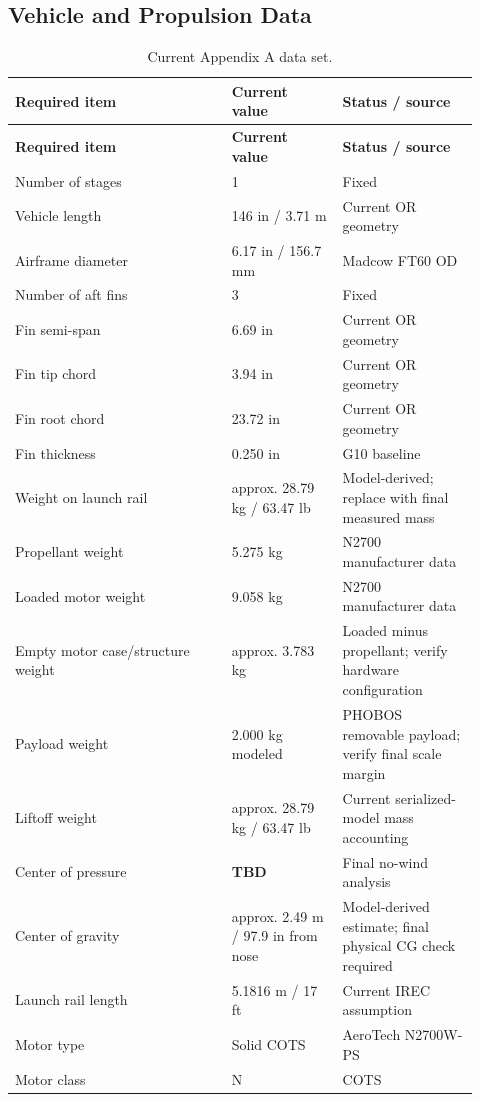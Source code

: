 \documentclass[10pt]{article}
\newcommand{\TBD}{\textbf{TBD}}
\begin{document}
\subsection{Vehicle and Propulsion Data}
\begin{longtable}{@{}p{0.43\linewidth}p{0.22\linewidth}p{0.27\linewidth}@{}}
\caption{Current Appendix A data set.}\\
\toprule
\textbf{Required item} & \textbf{Current value} & \textbf{Status / source} \\
\midrule
\endfirsthead
\toprule
\textbf{Required item} & \textbf{Current value} & \textbf{Status / source} \\
\midrule
\endhead
Number of stages & 1 & Fixed \\
Vehicle length & 146 in / 3.71 m & Current OR geometry \\
Airframe diameter & 6.17 in / 156.7 mm & Madcow FT60 OD \\
Number of aft fins & 3 & Fixed \\
Fin semi-span & 6.69 in & Current OR geometry \\
Fin tip chord & 3.94 in & Current OR geometry \\
Fin root chord & 23.72 in & Current OR geometry \\
Fin thickness & 0.250 in & G10 baseline \\
Weight on launch rail & approx. 28.79 kg / 63.47 lb & Model-derived; replace with final measured mass \\
Propellant weight & 5.275 kg & N2700 manufacturer data \\
Loaded motor weight & 9.058 kg & N2700 manufacturer data \\
Empty motor case/structure weight & approx. 3.783 kg & Loaded minus propellant; verify hardware configuration \\
Payload weight & 2.000 kg modeled & PHOBOS removable payload; verify final scale margin \\
Liftoff weight & approx. 28.79 kg / 63.47 lb & Current serialized-model mass accounting \\
Center of pressure & \TBD & Final no-wind analysis \\
Center of gravity & approx. 2.49 m / 97.9 in from nose & Model-derived estimate; final physical CG check required \\
Launch rail length & 5.1816 m / 17 ft & Current IREC assumption \\
Motor type & Solid COTS & AeroTech N2700W-PS \\
Motor class & N & COTS \\

\end{longtable}
\end{document}

